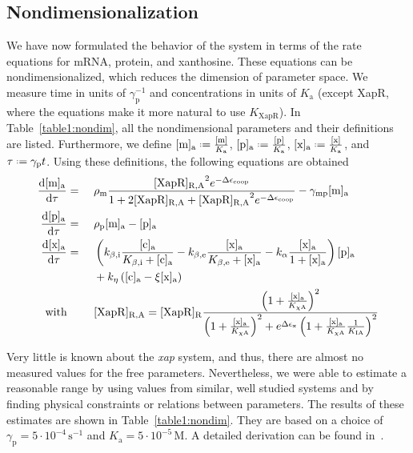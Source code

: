 \documentclass[10pt,letterpaper]{article}
\newcommand{\unit}[1]{\,\mathrm{#1}}
\newcommand{\n}[1]{\mathrm{#1}}
\newcommand{\dd}[2]{\frac{\mathrm{d} #1}{\mathrm{d} #2}}
\newcommand*{\defeq}{\mathrel{\vcenter{\baselineskip0.5ex \lineskiplimit0pt
			\hbox{\scriptsize.}\hbox{\scriptsize.}}}%
	=}
\begin{document}
	\subsection*{Nondimensionalization}
	We have now formulated the behavior of the system in terms of the rate
	equations for mRNA, protein, and xanthosine. These equations can be
	nondimensionalized, which reduces the dimension of parameter space. We
	measure time in units of $\gamma_{\n{p}}^{-1}$ and concentrations in units
	of $K_{\n{a}}$ (except XapR, where the equations make it more natural to use
	$K_{\n{XapR}}$). In Table~\ref{table1:nondim}, all the nondimensional
	parameters and their definitions are listed. Furthermore, we define
	$\n{[m]_a} \defeq \frac{\n{[m]}}{K_{\n{a}}}$, $\n{[p]_a} \defeq
	\frac{\n{[p]}}{K_{\n{a}}}$, $\n{[x]_a} \defeq \frac{\n{[x]}}{K_{\n{a}}}$,
	and $\tau \defeq \gamma_{\n{p}} t$. Using these definitions, the following
	equations are obtained
	\begin{alignat}{2}
	\dd{\mathrm{[m]_a}}{\tau} &= \ &&
	\rho_{\n{m}} 
	\frac{
		\mathrm{[XapR]_{R,A}}^2 
		e^{- \Delta \epsilon_{\text{coop}}}
	}{
		1 + 
		2 \mathrm{[XapR]_{R,A}} +
		\mathrm{[XapR]_{R,A}}^2 e^{- \Delta \epsilon_{\text{coop}}}
	}
	- \gamma_{\n{mp}} \mathrm{[m]_a}
	\\
	\dd{\mathrm{[p]_a}}{\tau} &= \ &&
	\rho_{\n{p}} \mathrm{[m]_a}
	- \mathrm{[p]_a}
	\\
	\dd{\mathrm{[x]_a}}{\tau} &= \ && \left(k_{\n{\beta,i}} \frac{\n{[c]_a}}{K_{\n{\beta,i}} + \n{[c]_a}} - k_{\n{\beta,e}} \frac{\n{[x]_a}}{K_{\n{\beta,e}} + \n{[x]_a}} - k_{\n{\alpha}} \frac{\n{[x]_a}}{1 + \n{[x]_a}}\right) \mathrm{[p]_a} \\ & && + k_{\n{\eta}} \left(\mathrm{[c]_a} - \xi \mathrm{[x]_a}\right)
	\nonumber \\
	\text{with} & && \raggedleft [\n{XapR}]_{\mathrm{R,\n{A}}} = [\n{XapR}]_{\mathrm{R}} \frac{\left(1 + \frac{\mathrm{[x]_{\n{a}}}}{K_{\n{\chi A}}}\right)^2}{\left(1 + \frac{\mathrm{[x]_{\n{a}}}}{K_{\n{\chi A}}}\right)^2 + e^{\Delta \epsilon_{\n{x}}} \left(1+\frac{\mathrm{[x]_{\n{a}}}}{K_{\n{\chi A}}} \frac{1}{K_{\n{IA}}}\right)^2} \nonumber
	\end{alignat}
	
	Very little is known about the \emph{xap} system, and thus, there are almost no
	measured values for the free parameters. Nevertheless, we were able to
	estimate a reasonable range by using values from similar, well studied
	systems and by finding physical constraints or relations between parameters.
	The results of these estimates are shown in Table~\ref{table1:nondim}. They
	are based on a choice of $\gamma_{\n{p}} = 5 \cdot 10^{-4} \unit{s^{-1}}$
	and $K_{\n{a}} = 5 \cdot 10^{-5} \unit{M}$. A detailed derivation can be
	found in~. 
	
\end{document}
